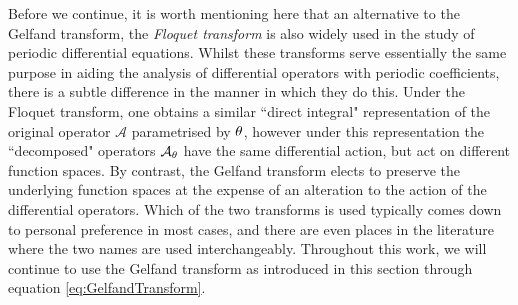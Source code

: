 Before we continue, it is worth mentioning here that an alternative to the Gelfand transform, the \emph{Floquet transform} is also widely used in the study of periodic differential equations.
Whilst these transforms serve essentially the same purpose in aiding the analysis of differential operators with periodic coefficients, there is a subtle difference in the manner in which they do this.
Under the Floquet transform, one obtains a similar ``direct integral" representation of the original operator $\mathcal{A}$ parametrised by $\theta$, however under this representation the ``decomposed" operators $\mathcal{A}_{\theta}$ have the same differential action, but act on different function spaces.
By contrast, the Gelfand transform elects to preserve the underlying function spaces at the expense of an alteration to the action of the differential operators.
Which of the two transforms is used typically comes down to personal preference in most cases, and there are even places in the literature where the two names are used interchangeably.
Throughout this work, we will continue to use the Gelfand transform as introduced in this section through equation \eqref{eq:GelfandTransform}.